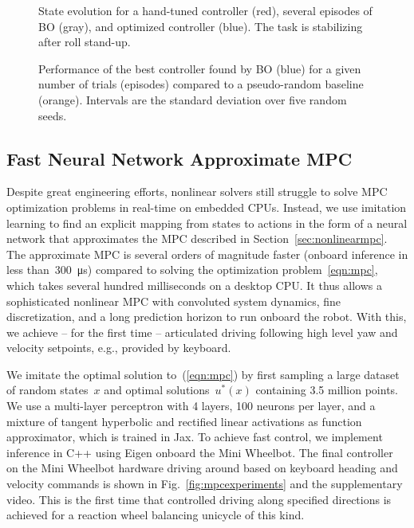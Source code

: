\begin{figure}[tb]
    \centering%
    
    \caption{State evolution for a hand-tuned controller ({\color{red}red}), several episodes of BO ({\color{gray}gray}), and optimized controller ({\color{blue}blue}). The task is stabilizing after roll stand-up.}
    \label{fig:boclosedloop}
\end{figure}%
\begin{figure}[tb]
    \centering%
    
    \caption{Performance of the best controller found by BO ({\color{blue}blue}) for a given number of trials (episodes) compared to a pseudo-random baseline ({\color{orange}orange}). Intervals are the standard deviation over five random seeds.}
    \label{fig:boperformanceimprovement}
\end{figure}


\subsection{Fast Neural Network Approximate MPC}
\label{sec:ampc}
Despite great engineering efforts, nonlinear solvers still struggle to solve MPC optimization problems in real-time on embedded CPUs.
Instead, we use imitation learning to find an explicit mapping from states to actions in the form of a neural network that approximates the MPC described in Section~\ref{sec:nonlinearmpc}.
The approximate MPC is several orders of magnitude faster (onboard inference in less than~\SI{300}{\micro\second}) compared to solving the optimization problem~\eqref{eqn:mpc}, which takes several hundred milliseconds on a desktop CPU.
It thus allows a sophisticated nonlinear MPC with convoluted system dynamics, fine discretization, and a long prediction horizon to run onboard the robot.
With this, we achieve -- for the first time -- articulated driving following high level yaw and velocity setpoints, e.g., provided by keyboard.

We imitate the optimal solution to~(\ref{eqn:mpc}) by first sampling a large dataset of random states~$x$ and optimal solutions~$u^*(x)$ containing \num{3.5} million points.
We use a multi-layer perceptron with \num{4} layers, \num{100} neurons per layer, and a mixture of tangent hyperbolic and rectified linear activations as function approximator, which is trained in Jax.
To achieve fast control, we implement inference in C++ using Eigen onboard the Mini Wheelbot.
The final controller on the Mini Wheelbot hardware driving around based on keyboard heading and velocity commands is shown in Fig.~\ref{fig:mpcexperiments} and the supplementary video.
This is the first time that controlled driving along specified directions is achieved for a reaction wheel balancing unicycle of this kind.

